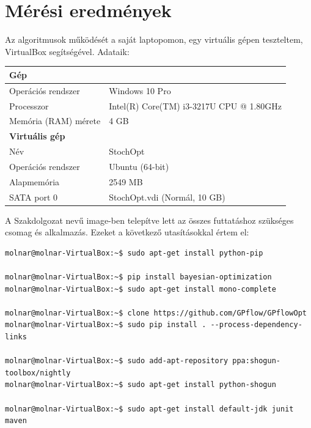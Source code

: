 \chapter{Mérési eredmények}
\label{sec:meresek}
Az algoritmusok működését a saját laptopomon, egy virtuális gépen teszteltem, VirtualBox segítségével. Adataik:
\begin{center}
	\begin{tabular}{ll}
		\hline
		\textbf{Gép} & \\
		\hline
		Operációs rendszer & Windows 10 Pro\\
		Processzor & Intel(R) Core(TM) i3-3217U CPU @ 1.80GHz\\
		Memória (RAM) mérete & 4 GB\\
		\hline
		\textbf{Virtuális gép} & \\
		\hline
		Név & StochOpt\\
		Operációs rendszer & Ubuntu (64-bit)\\
		Alapmemória & 2549 MB\\
		SATA port 0 & StochOpt.vdi (Normál, 10 GB)
	\end{tabular}
\end{center}

A Szakdolgozat nevű image-ben telepítve lett az összes futtatáshoz szükséges csomag és alkalmazás. Ezeket a következő utasításokkal értem el:
\begin{lstlisting}
molnar@molnar-VirtualBox:~$ sudo apt-get install python-pip

molnar@molnar-VirtualBox:~$ pip install bayesian-optimization
molnar@molnar-VirtualBox:~$ sudo apt-get install mono-complete

molnar@molnar-VirtualBox:~$ clone https://github.com/GPflow/GPflowOpt
molnar@molnar-VirtualBox:~$ sudo pip install . --process-dependency-links

molnar@molnar-VirtualBox:~$ sudo add-apt-repository ppa:shogun-toolbox/nightly
molnar@molnar-VirtualBox:~$ sudo apt-get install python-shogun

molnar@molnar-VirtualBox:~$ sudo apt-get install default-jdk junit maven
\end{lstlisting}

